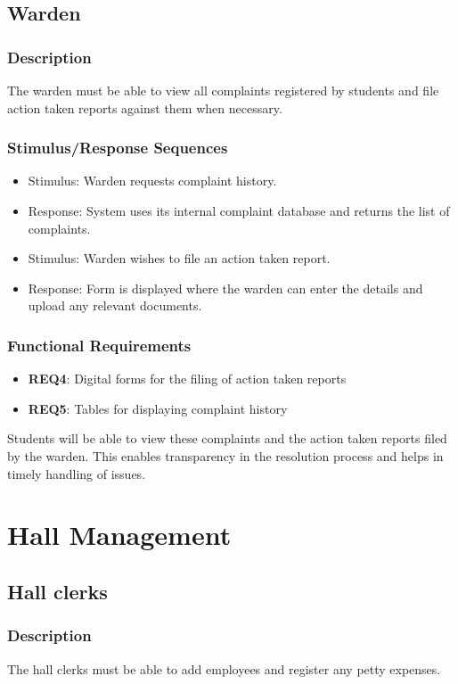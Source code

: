 \documentclass{scrreprt}
\begin{document}
\subsection{Warden}
\subsubsection{Description}
The warden must be able to view all complaints registered by students and file action taken reports against them when necessary.
\subsubsection{Stimulus/Response Sequences}
\begin{itemize}
    \item Stimulus: Warden requests complaint history.
    \item Response: System uses its internal complaint database and returns the list of complaints.
\end{itemize}
\begin{itemize}
    \item Stimulus: Warden wishes to file an action taken report.
    \item Response: Form is displayed where the warden can enter the details and upload any relevant documents.
\end{itemize}

\subsubsection{Functional Requirements}
\begin{itemize}
    \item \textbf{REQ4}: Digital forms for the filing of action taken reports
    \item \textbf{REQ5}: Tables for displaying complaint history
\end{itemize}
Students will be able to view these complaints and the action taken reports filed by the warden. This enables transparency in the resolution process and helps in timely handling of issues.

\section{Hall Management}
\subsection{Hall clerks}
\subsubsection{Description}
The hall clerks must be able to add employees and register any petty expenses.
\end{document}
